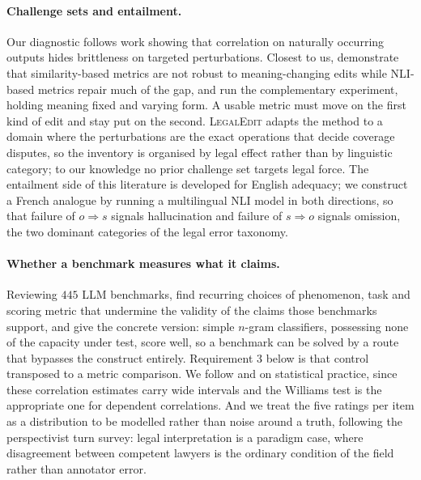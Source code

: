 \documentclass[11pt]{article}
\begin{document}
\paragraph{Challenge sets and entailment.}
Our diagnostic follows work showing that correlation on naturally occurring
outputs hides brittleness on targeted perturbations. Closest to us,
\citet{chen2023menli} demonstrate
that similarity-based metrics are not robust to meaning-changing edits while
NLI-based metrics repair much of the gap, and \citet{mujahid2026stress} run the
complementary experiment, holding meaning fixed and varying form. A usable
metric must move on the first kind of edit and stay put on the second.
\textsc{LegalEdit} adapts the method to a
domain where the perturbations are the exact operations that decide coverage
disputes, so the inventory is organised by legal effect rather than by
linguistic category; to our knowledge no prior challenge set targets legal
force. The entailment side of this literature is developed for English
adequacy; we construct a French analogue by running a multilingual NLI model
\citep{laurer2024nli} in both directions, so that failure
of $o \Rightarrow s$ signals hallucination and failure of $s \Rightarrow o$
signals omission, the two dominant categories of the legal error taxonomy.

\paragraph{Whether a benchmark measures what it claims.}
Reviewing $445$ LLM benchmarks, \citet{bean2025construct} find recurring choices
of phenomenon, task and scoring metric that undermine the validity of the claims
those benchmarks support, and \citet{pacchiardi2024cleverhans} give the concrete
version: simple $n$-gram classifiers, possessing none of the capacity under
test, score well, so a benchmark can be solved by a route that bypasses the
construct entirely. Requirement 3 below is that control transposed to a metric
comparison. We follow \citet{deutsch2021statistical} and
\citet{graham2014williams} on statistical practice, since these correlation
estimates carry wide intervals and the Williams test is the appropriate one for
dependent correlations. And we treat the five ratings per item as a distribution
to be modelled rather than noise around a truth, following the perspectivist
turn \citet{xu2026disagreement} survey: legal interpretation is a paradigm case,
where disagreement between competent lawyers is the ordinary condition of the
field rather than annotator error.
\end{document}
